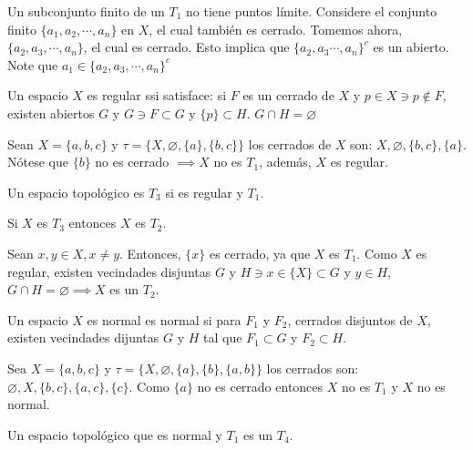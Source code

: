 \begin{nota}
    Un subconjunto finito de un $T_1$ no tiene puntos límite. Considere el conjunto finito $\{a_1,a_2,\cdots,a_n\}$ en $X$, el cual también es cerrado. Tomemos ahora, $\{a_2,a_3,\cdots,a_n\}$, el cual es cerrado. Esto implica que $\{a_2,a_3\cdots,a_n\}^c$ es un abierto. Note que $a_1\in \{a_2,a_3,\cdots,a_n\}^c$
\end{nota}

\begin{definicion}
    Un espacio $X$ es regular ssi satisface: 
    si $F$ es un cerrado de $X$ y $p\in X\ni p\not\in F$, existen abiertos $G$ y $G\ni F\subset G$ y $\{p\}\subset H$. $G\cap H=\varnothing$
\end{definicion}

\begin{nota}
    Sean $X=\{a,b,c\}$ y $\tau=\{X,\varnothing, \{a\},\{b,c\}\}$ los cerrados de $X$ son: $X,\varnothing,\{b,c\},\{a\}$. Nótese que $\{b\}$ no es cerrado $\implies X$ no es $T_1$, además, $X$ es regular.  
\end{nota}

\begin{definicion}
    Un espacio topológico es $T_3$ si es regular y $T_1$. 
\end{definicion}

\begin{teorema}
    Si $X$ es $T_3$ entonces $X$ es $T_2$. 
    \begin{dem}
        Sean $x,y\in X, x\neq y$. Entonces, $\{x\}$ es cerrado, ya que $X$ es $T_1$. Como $X$ es regular, existen vecindades disjuntas $G$ y $H\ni x\in \{X\}\subset G$ y $y\in H$, $G\cap H =\varnothing\implies X$ es un $T_2$.  
    \end{dem}
\end{teorema}

\begin{teorema}
    Un espacio $X$ es normal es normal si para $F_1$ y $F_2$, cerrados disjuntos de $X$, existen vecindades dijuntas $G$ y $H$ tal que $F_1\subset G$ y $F_2\subset H$.
\end{teorema}

\begin{ejemplo}
    Sea $X=\{a,b,c\}$ y $\tau=\{X,\varnothing, \{a\}, \{b\}, \{a,b\}\}$ los cerrados son: $\varnothing,X,\{b,c\},\{a,c\},\{c\}$. Como $\{a\}$ no es cerrado entonces $X$ no es $T_1$ y $X$ no es normal. 
\end{ejemplo}

\begin{definicion}
    Un espacio topológico que es normal y $T_1$ es un $T_4$. 
\end{definicion}

